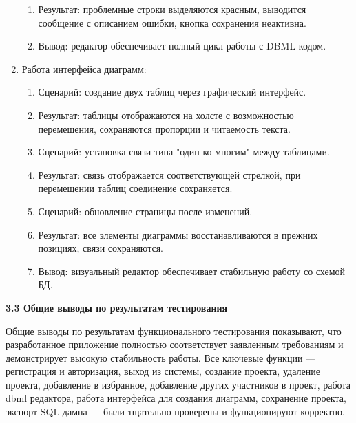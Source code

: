 \begin{enumerate}
\begin{enumerate}
    \item Результат: проблемные строки выделяются красным, выводится сообщение с описанием ошибки, кнопка сохранения неактивна.
    
    \item Вывод: редактор обеспечивает полный цикл работы с DBML-кодом.

    \end{enumerate}

\item Работа интерфейса диаграмм:
    \begin{enumerate}
    \item Сценарий: создание двух таблиц через графический интерфейс.
    
    \item Результат: таблицы отображаются на холсте с возможностью перемещения, сохраняются пропорции и читаемость текста.
    
    \item Сценарий: установка связи типа "один-ко-многим" между таблицами.
    
    \item Результат: связь отображается соответствующей стрелкой, при перемещении таблиц соединение сохраняется.
    
    \item Сценарий: обновление страницы после изменений.
    
    \item Результат: все элементы диаграммы восстанавливаются в прежних позициях, связи сохраняются.
    
    \item Вывод: визуальный редактор обеспечивает стабильную работу со схемой БД.

    \end{enumerate}
    
\end{enumerate}

\textbf{3.3 Общие выводы по результатам тестирования}

Общие выводы по результатам функционального тестирования
показывают, что разработанное приложение полностью соответствует
заявленным требованиям и демонстрирует высокую стабильность работы. Все
ключевые функции — регистрация
и авторизация, выход из системы, создание проекта, удаление проекта, добавление в избранное, добавление других участников в проект, работа dbml редактора, работа интерфейса для создания диаграмм, сохранение проекта, экспорт SQL-дампа — были тщательно проверены и
функционируют корректно.

